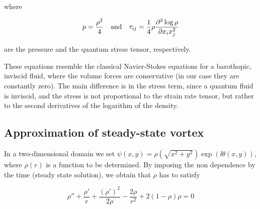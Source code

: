 where 

\[
    p = \frac{\rho^2}{4} \quad \text{and} \quad \tau_{ij} = \frac14 \rho \frac{\partial^{2} \log \rho}{\partial x_i x_j^{2}}
\]

are the pressure and the quantum stress tensor, respectively. 

These equations resemble the classical Navier-Stokes equations for a barothopic, inviscid fluid, where the volume forces are conservative (in our case they are constantly zero). The main difference is in the stress term, since a quantum fluid is inviscid, and the stress is not proportional to the strain rate tensor, but rather to the second derivatives of the logarithm of the density.

\subsection{Approximation of steady-state vortex}

In a two-dimensional domain we set $\psi(x,y) = \rho\left(\sqrt{x^2 + y^2}\right)\exp\left(\ii \theta(x,y)\right)$, where $\rho(r)$ is a function to be determined. By imposing the non dependence by the time (steady state solution), we obtain that $\rho$ has to satisfy

\begin{equation}
    \rho'' + \frac{\rho'}{r} + \frac{(\rho')^2}{2\rho} - \frac{2\rho}{r^2} + 2(1 - \rho)\rho = 0
    \label{eq:density}
\end{equation}



